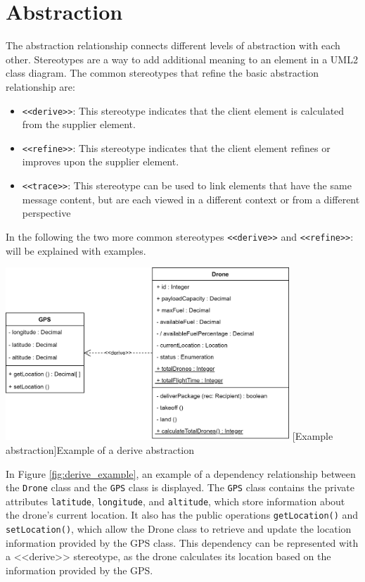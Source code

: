 \documentclass[
	12pt,
    a4paper,
    egregdoesnotlikesansseriftitles, %
    toc=chapterentrywithdots,
    oneside, openany,
    titlepage,
    parskip=half,
    headings=normal,  %
    listof=totoc,
    bibliography=totocnumbered,
    index=totoc,
    captions=tableheading,  %
    listof=flat,
    numbers=noenddot, %
    final]
    {scrbook}
\begin{document}
\section{Abstraction}
The abstraction relationship connects different levels of abstraction with each other.
Stereotypes are a way to add additional meaning to an element in a UML2 class diagram. 
The common stereotypes that refine the basic abstraction relationship are: \cite{ibm_dependencies}
\begin{itemize}
	\item \texttt{<<derive>>}: This stereotype indicates that the client element is calculated from the supplier element.
	\item \texttt{<<refine>>}: This stereotype indicates that the client element refines or improves upon the supplier element.
	\item \texttt{<<trace>>}: This stereotype can be used to link elements that have the same message content, but are each viewed in a different context or from a different perspective
\end{itemize}


In the following the two more common stereotypes \texttt{<<derive>>} and \texttt{<<refine>>}: will be explained with examples.


\vspace{1em}
\begin{minipage}{\linewidth}
	\centering
	\includegraphics[width=0.8\textwidth]{figures/dependencies/derive.jpg}
	[Example abstraction]{Example of a derive abstraction}
	\label{fig:derive_example}
\end{minipage}
\vspace{1em}


In Figure \ref{fig:derive_example}, an example of a dependency relationship between the \texttt{Drone} class and the \texttt{GPS} class is displayed. 
The \texttt{GPS} class contains the private attributes \texttt{latitude}, \texttt{longitude}, and \texttt{altitude}, which store information about the drone's current location. It also has the public operations \texttt{getLocation()} and \texttt{setLocation()}, which allow the Drone class to retrieve and update the location information provided by the GPS class.
This dependency can be represented with a <<derive>> stereotype, as the drone calculates its location based on the information provided by the GPS.
\end{document}
